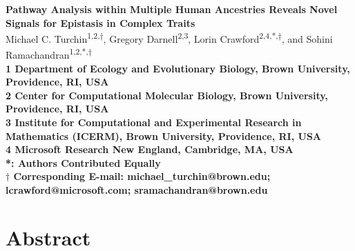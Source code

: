 \documentclass[10pt]{article}
\begin{document}
\linenumbers
\begin{flushleft}
{\Large
\textbf{Pathway Analysis within Multiple Human Ancestries Reveals Novel Signals for Epistasis in Complex Traits}
}
\newline
\\
Michael C. Turchin\textsuperscript{1,2,$\dagger$}, Gregory Darnell\textsuperscript{2,3}, Lorin Crawford\textsuperscript{2,4,*,$\dagger$}, and Sohini Ramachandran\textsuperscript{1,2,*,$\dagger$} 
\\
\bigskip
\bf{1} Department of Ecology and Evolutionary Biology, Brown University, Providence, RI, USA
\\
\bf{2} Center for Computational Molecular Biology, Brown University, Providence, RI, USA
\\
\bf{3} Institute for Computational and Experimental Research in Mathematics (ICERM), Brown University, Providence, RI, USA
\\
\bf{4} Microsoft Research New England, Cambridge, MA, USA
\\
\bigskip
*: Authors Contributed Equally\\
$\dagger$ Corresponding E-mail: michael\_turchin@brown.edu; lcrawford@microsoft.com; sramachandran@brown.edu 
\end{flushleft}


\section*{Abstract}\label{InterPath-Abstract} 
\end{document}
